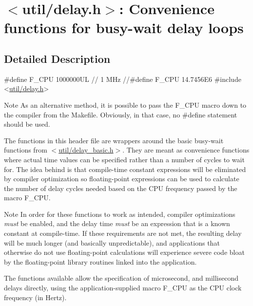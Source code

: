 \hypertarget{group__util__delay}{}\section{$<$util/delay.h$>$\+: Convenience functions for busy-\/wait delay loops}
\label{group__util__delay}


\subsection{Detailed Description}

\begin{DoxyCode}
\textcolor{preprocessor}{#define F\_CPU 1000000UL  // 1 MHz}
\textcolor{comment}{//#define F\_CPU 14.7456E6}
\textcolor{preprocessor}{#include <\hyperlink{util_2delay_8h}{util/delay.h}>}
\end{DoxyCode}


\begin{DoxyNote}{Note}
As an alternative method, it is possible to pass the F\+\_\+\+C\+PU macro down to the compiler from the Makefile. Obviously, in that case, no {\ttfamily \#define} statement should be used.
\end{DoxyNote}
The functions in this header file are wrappers around the basic busy-\/wait functions from $<$\hyperlink{delay__basic_8h}{util/delay\+\_\+basic.\+h}$>$. They are meant as convenience functions where actual time values can be specified rather than a number of cycles to wait for. The idea behind is that compile-\/time constant expressions will be eliminated by compiler optimization so floating-\/point expressions can be used to calculate the number of delay cycles needed based on the C\+PU frequency passed by the macro F\+\_\+\+C\+PU.

\begin{DoxyNote}{Note}
In order for these functions to work as intended, compiler optimizations {\itshape must} be enabled, and the delay time {\itshape must} be an expression that is a known constant at compile-\/time. If these requirements are not met, the resulting delay will be much longer (and basically unpredictable), and applications that otherwise do not use floating-\/point calculations will experience severe code bloat by the floating-\/point library routines linked into the application.
\end{DoxyNote}
The functions available allow the specification of microsecond, and millisecond delays directly, using the application-\/supplied macro F\+\_\+\+C\+PU as the C\+PU clock frequency (in Hertz). 